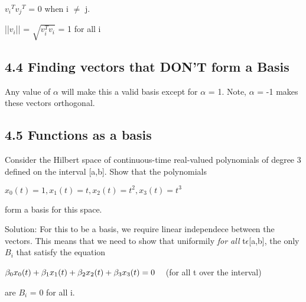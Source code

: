 \documentclass[11pt]{article}
\begin{document}
\begin{center}

$v_i$$^T$$v_j$$^T$ = 0 when i $\neq$ j.

||$v_i$|| = $\sqrt{v_i^T v_i}$ = 1 for all i 

\end{center}

\subsection*{4.4 \hspace{3mm} Finding vectors that DON'T form a Basis}
Any value of $\alpha$ will make this a valid basis except for $\alpha$ = 1. Note, $\alpha$ = -1 makes these vectors orthogonal.


\subsection*{4.5 \hspace{3mm} Functions as a basis}

Consider the Hilbert space of continuous-time real-valued polynomials of degree 3 defined on the interval [a,b]. Show that the polynomials\newline

\begin{center}

$x_0(t) = 1, x_1(t) = t, x_2(t) = t^2, x_3(t) = t^3$

\end{center}

\vspace{3mm}

form a basis for this space.\newline\newline

Solution: For this to be a basis, we require linear independece between the vectors. This means that we need to show that uniformily \emph{for all} t$\epsilon$[a,b], the only $B_i$ that satisfy the equation

\begin{center}

$\beta_0 x_0(t) + \beta_1 x_1(t) + \beta_2 x_2(t) + \beta_3 x_3(t) = 0   \hspace{3mm}$  (for all t over the interval)

\end{center}

are $B_i$ = 0 for all i.\newline
\end{document}
